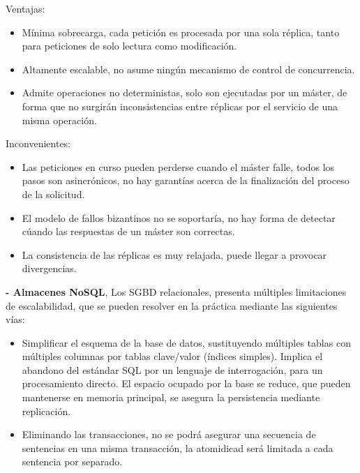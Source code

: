 \documentclass[12pt]{amsart}
\begin{document}
    Ventajas:
    
    \begin{itemize}
    \item Mínima sobrecarga, cada petición es procesada por una sola réplica, tanto para peticiones de solo lectura como modificación.
    
    \item Altamente escalable, no asume ningún mecanismo de control de concurrencia.
    
    \item Admite operaciones no deterministas, solo son ejecutadas por un máster, de forma que no surgirán inconsistencias entre réplicas por el servicio de una misma operación.
    \end{itemize}
    
    Inconvenientes:
    
    \begin{itemize}
    \item Las peticiones en curso pueden perderse cuando el máster falle, todos los pasos son asincrónicos, no hay garantías acerca de la finalización del proceso de la solicitud. 
    
    \item El modelo de fallos bizantinos no se soportaría, no hay forma de detectar cúando las respuestas de un máster son correctas.
    
    \item La consistencia de las réplicas es muy relajada, puede llegar a provocar divergencias.
    \end{itemize}
    
    \textbf{- Almacenes NoSQL}, Los SGBD relacionales, presenta múltiples limitaciones de escalabilidad, que se pueden resolver en la práctica mediante las siguientes vías:
    
    \begin{itemize}
    \item Simplificar el esquema de la base de datos, sustituyendo múltiples tablas con múltiples columnas por tablas clave/valor (índices simples).
    Implica el abandono del estándar SQL por un lenguaje de interrogación, para un procesamiento directo. El espacio ocupado por la base se reduce, que pueden mantenerse en memoria principal, se asegura la persistencia mediante replicación.
    
    \item Eliminando las transacciones, no se podrá asegurar una secuencia de sentencias en una misma transacción, la atomidicad será limitada a cada sentencia por separado.
    \end{itemize}
    
\end{document}
